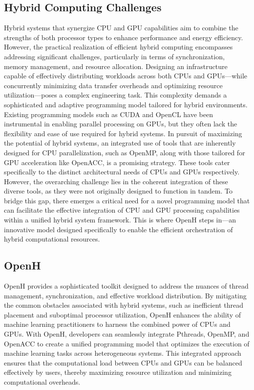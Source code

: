 \documentclass[11.5pt]{article}
\begin{document}
\subsection{Hybrid Computing Challenges}
Hybrid systems that synergize CPU and GPU capabilities aim to combine the strengths of both processor types to enhance performance and energy efficiency. 
However, the practical realization of efficient hybrid computing encompasses addressing significant challenges, particularly in terms of synchronization, memory management, and resource allocation. Designing an infrastructure capable of effectively distributing workloads across both CPUs and GPUs—while concurrently minimizing data transfer overheads and optimizing resource utilization—poses a complex engineering task. This complexity demands a sophisticated and adaptive programming model tailored for hybrid environments.
Existing programming models such as CUDA and OpenCL have been instrumental in enabling parallel processing on GPUs, but they often lack the flexibility and ease of use required for hybrid systems.
In pursuit of maximizing the potential of hybrid systems, an integrated use of tools that are inherently designed for CPU parallelization, such as OpenMP, along with those tailored for GPU acceleration like OpenACC, is a promising strategy. These tools cater specifically to the distinct architectural needs of CPUs and GPUs respectively. However, the overarching challenge lies in the coherent integration of these diverse tools, as they were not originally designed to function in tandem.
To bridge this gap, there emerges a critical need for a novel programming model that can facilitate the effective integration of CPU and GPU processing capabilities within a unified hybrid system framework. This is where OpenH steps in—an innovative model designed specifically to enable the efficient orchestration of hybrid computational resources.

\subsection{OpenH}
OpenH provides a sophisticated toolkit designed to address the nuances of thread management, synchronization, and effective workload distribution. 
By mitigating the common obstacles associated with hybrid systems, such as inefficient thread placement and suboptimal processor utilization, OpenH enhances the ability of machine learning practitioners to harness the combined power of CPUs and GPUs.
With OpenH, developers can seamlessly integrate Pthreads, OpenMP, and OpenACC to create a unified programming model that optimizes the execution of machine learning tasks across heterogeneous systems. 
This integrated approach ensures that the computational load between CPUs and GPUs can be balanced effectively by users, thereby maximizing resource utilization and minimizing computational overheads.
\end{document}
